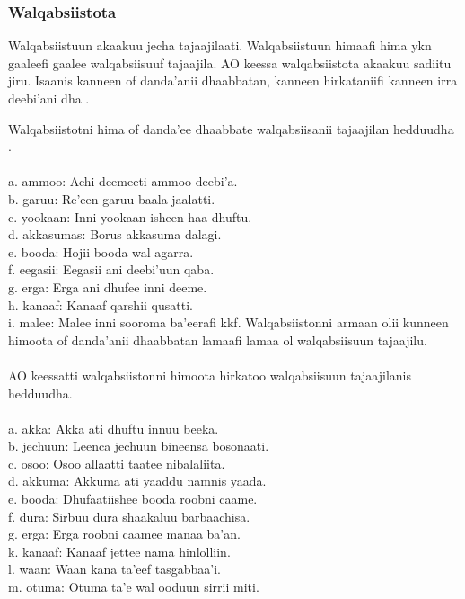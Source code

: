 \documentclass[11pt,b5paper]{book}
\begin{document}
\subsubsection{Walqabsiistota}

Walqabsiistuun akaakuu jecha tajaajilaati. Walqabsiistuun himaafi hima ykn gaaleefi gaalee walqabsiisuuf tajaajila. AO keessa walqabsiistota akaakuu sadiitu jiru. Isaanis kanneen of danda’anii dhaabbatan, kanneen hirkataniifi kanneen irra deebi’ani dha \cite[p.55]{griefenow2001grammatical}. 

Walqabsiistotni hima of danda’ee dhaabbate walqabsiisanii tajaajilan hedduudha \cite[p.56]{griefenow2001grammatical}.\\
\\
a. ammoo:  Achi deemeeti ammoo deebi’a.\\
b. garuu:  Re’een garuu baala jaalatti.\\
c. yookaan: Inni yookaan isheen haa dhuftu.\\
d. akkasumas: Borus akkasuma dalagi.\\
e. booda:  Hojii booda wal agarra.\\
f. eegasii: Eegasii ani deebi’uun qaba.\\
g. erga: Erga ani dhufee inni deeme.\\
h. kanaaf: Kanaaf qarshii qusatti.\\
i. malee: Malee inni sooroma ba’eerafi kkf. Walqabsiistonni armaan olii kunneen himoota of danda’anii
dhaabbatan lamaafi lamaa ol walqabsiisuun tajaajilu. \\
\\
AO keessatti walqabsiistonni himoota hirkatoo walqabsiisuun tajaajilanis hedduudha.\\
\\
a. akka: Akka ati dhuftu innuu beeka.\\
b. jechuun: Leenca jechuun bineensa bosonaati.\\
c. osoo: Osoo allaatti taatee nibalaliita.\\
d. akkuma: Akkuma ati yaaddu namnis yaada.\\
e. booda: Dhufaatiishee booda roobni caame.\\
f. dura: Sirbuu dura shaakaluu barbaachisa.\\
g. erga: Erga roobni caamee manaa ba’an.\\
k. kanaaf: Kanaaf jettee nama hinlolliin.\\
l. waan: Waan kana ta’eef tasgabbaa’i.\\
m. otuma: Otuma ta’e wal ooduun sirrii miti.\\
\end{document}
